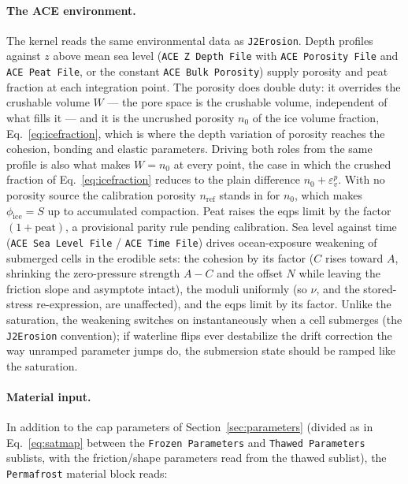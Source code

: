 \documentclass[12pt]{article}
\begin{document}
\paragraph{The ACE environment.}
The kernel reads the same environmental data as \texttt{J2Erosion}.
Depth profiles against $z$ above mean sea level
(\texttt{ACE Z Depth File} with \texttt{ACE Porosity File} and
\texttt{ACE Peat File}, or the constant \texttt{ACE Bulk Porosity})
supply porosity and peat fraction at each integration point. The
porosity does double duty: it overrides the crushable volume $W$
--- the pore space is the crushable volume, independent of what
fills it --- and it is the uncrushed porosity $n_0$ of the ice
volume fraction, Eq.~\eqref{eq:icefraction}, which is where the
depth variation of porosity reaches the cohesion, bonding and
elastic parameters. Driving both roles from the same profile is also
what makes $W = n_0$ at every point, the case in which the crushed
fraction of Eq.~\eqref{eq:icefraction} reduces to the plain
difference $n_0 + \varepsilon_v^p$. With no porosity source the
calibration porosity $n_{\mathrm{ref}}$ stands in for $n_0$, which
makes $\phi_{\mathrm{ice}} = S$ up to accumulated compaction. Peat
raises the eqps limit by the factor $(1 + \mathrm{peat})$, a
provisional parity rule pending calibration. Sea level against time
(\texttt{ACE Sea Level File} / \texttt{ACE Time File}) drives
ocean-exposure weakening of submerged cells in the erodible sets:
the cohesion by its factor ($C$ rises toward $A$, shrinking the
zero-pressure strength $A - C$ and the offset $N$ while leaving the
friction slope and asymptote intact), the moduli uniformly (so
$\nu$, and the stored-stress re-expression, are unaffected), and the
eqps limit by its factor. Unlike the saturation, the weakening
switches on instantaneously when a cell submerges (the
\texttt{J2Erosion} convention); if waterline flips ever destabilize
the drift correction the way unramped parameter jumps do, the
submersion state should be ramped like the saturation.

\paragraph{Material input.}
In addition to the cap parameters of Section~\ref{sec:parameters}
(divided as in Eq.~\eqref{eq:satmap} between the \texttt{Frozen Parameters} and
\texttt{Thawed Parameters} sublists, with the friction/shape
parameters read from the thawed sublist), the \texttt{Permafrost}
material block reads:
\end{document}
